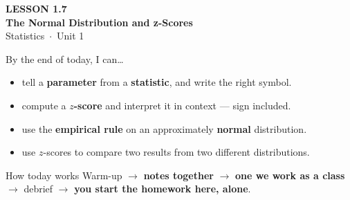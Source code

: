 \documentclass[aspectratio=169, 11pt]{beamer}
\begin{document}
{
\begin{frame}[plain]
  \vspace{2.8cm}\hspace{0.55cm}%
  \begin{minipage}{0.9\textwidth}
    {\color{goldacc}\bfseries\small LESSON 1.7}\\[0.5cm]
    {\color{white}\bfseries\LARGE The Normal Distribution and z-Scores}\\[1.2cm]
    {\color{skymid}\small Statistics~$\cdot$~Unit 1}
  \end{minipage}
\end{frame}
}

\newcommand{\redink}[1]{{\color{redacc}\bfseries #1}}

\begin{frame}[t, plain]
  By the end of today, I can\ldots
  \begin{itemize}\setlength{\itemsep}{5pt}
    \item tell a \textbf{parameter} from a \textbf{statistic}, and write the right symbol.
    \item compute a \textbf{$z$-score} and interpret it in context --- sign included.
    \item use the \textbf{empirical rule} on an approximately \textbf{normal} distribution.
    \item use $z$-scores to compare two results from two different distributions.
  \end{itemize}
  \begin{block}{How today works}
    Warm-up $\to$ \textbf{notes together} $\to$ \textbf{one we work as a class} $\to$
    debrief $\to$ \textbf{you start the homework here, alone}.
  \end{block}
\end{frame}
\end{document}
